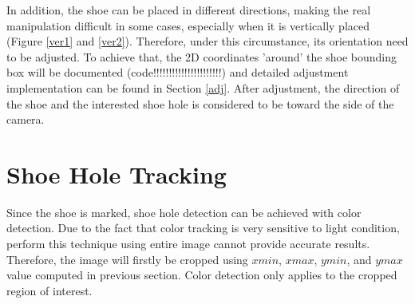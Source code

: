 In addition, the shoe can be placed in different directions, making the real manipulation difficult in some cases, especially when it is vertically placed (Figure \ref{ver1} and \ref{ver2}). Therefore, under this circumstance, its orientation need to be adjusted. To achieve that, the 2D coordinates 'around' the shoe bounding box will be documented (code!!!!!!!!!!!!!!!!!!!!!!) and detailed adjustment implementation can be found in Section \ref{adj}. After adjustment, the direction of the shoe and the interested shoe hole is considered to be toward the side of the camera.

\section{Shoe Hole Tracking}
Since the shoe is marked, shoe hole detection can be achieved with color detection. Due to the fact that color tracking is very sensitive to light condition, perform this technique using entire image cannot provide accurate results. Therefore, the image will firstly be cropped using $xmin$, $xmax$, $ymin$, and $ymax$ value computed in previous section. Color detection only applies to the cropped region of interest.

